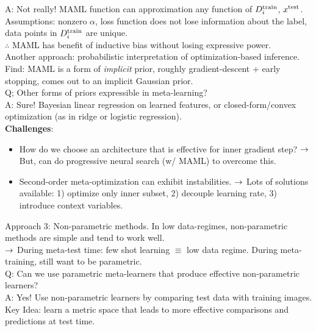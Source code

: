 A: Not really! MAML function can approximation any function of $D_i^{\text{train}}$, $x^{\text{test}}$. Assumptions: nonzero $\alpha$, loss function does not lose information about the label, data points in $D_i^{\text{train}}$ are unique. \\

$\therefore$ MAML has benefit of inductive bias without losing expressive power. \\

Another approach: probabilistic interpretation of optimization-based inference. Find: MAML is a form of {\it implicit} prior, roughly gradient-descent + early stopping, comes out to an implicit Gaussian prior. \\

Q; Other forms of priors expressible in meta-learning?  \\

A: Sure! Bayesian linear regression on learned features, or closed-form/convex optimization (as in ridge or logistic regression). \\


{\bf Challenges}:
\begin{itemize}
\item How do we choose an architecture that is effective for inner gradient step?
$\rightarrow$ But, can do progressive neural search (w/ MAML) to overcome this.

\item Second-order meta-optimization can exhibit instabilities.
$\rightarrow$ Lots of solutions available: 1) optimize only inner subset, 2) decouple learning rate, 3) introduce context variables.
\end{itemize}


Approach 3: Non-parametric methods. In low data-regimes, non-parametric methods are simple and tend to work well. \\

$\rightarrow$ During meta-test time: few shot learning $\equiv$ low data regime. During meta-training, still want to be parametric. \\

Q: Can we use parametric meta-learners that produce effective non-parametric learners? \\

A: Yes! Use non-parametric learners by comparing test data with training images. \\

Key Idea: learn a metric space that leads to more effective comparisons and predictions at test time. \\

